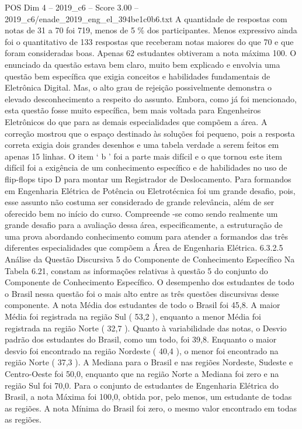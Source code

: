 \begin{textsample}{POS Dim 4 – 2019\_c6 – Score 3.00 – 2019\_c6/enade\_2019\_eng\_el\_394be1c0b6.txt}
A quantidade de respostas com notas de 31 a 70 foi 719, menos de 5 \% dos participantes.
Menos expressivo ainda foi o quantitativo de 133 respostas que receberam notas maiores do que 70 e que foram consideradas boas.
Apenas 62 estudantes obtiveram a nota máxima 100.
O enunciado da questão estava bem claro, muito bem explicado e envolvia uma questão bem específica que exigia conceitos e habilidades fundamentais de Eletrônica Digital.
Mas, o alto grau de rejeição possivelmente demonstra o elevado desconhecimento a respeito do assunto.
Embora, como já foi mencionado, esta questão fosse muito específica, bem mais voltada para Engenheiros Eletrônicos do que para as demais especialidades que compõem a área.
A correção mostrou que o espaço destinado às soluções foi pequeno, pois a resposta correta exigia dois grandes desenhos e uma tabela verdade a serem feitos em apenas 15 linhas.
O item ‘ b ’ foi a parte mais difícil e o que tornou este item difícil foi a exigência de um conhecimento específico e de habilidades no uso de flip-flops tipo D para montar um Registrador de Deslocamento.
Para formandos em Engenharia Elétrica de Potência ou Eletrotécnica foi um grande desafio, pois, esse assunto não costuma ser considerado de grande relevância, além de ser oferecido bem no início do curso.
Compreende -se como sendo realmente um grande desafio para a avaliação dessa área, especificamente, a estruturação de uma prova abordando conhecimento comum para atender a formandos das três diferentes especialidades que compõem a Área de Engenharia Elétrica. 6.3.2.5 Análise da Questão Discursiva 5 do Componente de Conhecimento Específico Na Tabela 6.21, constam as informações relativas à questão 5 do conjunto do Componente de Conhecimento Específico.
O desempenho dos estudantes de todo o Brasil nessa questão foi o mais alto entre as três questões discursivas desse componente.
A nota Média dos estudantes de todo o Brasil foi 45,8.
A maior Média foi registrada na região Sul ( 53,2 ), enquanto a menor Média foi registrada na região Norte ( 32,7 ).
Quanto à variabilidade das notas, o Desvio padrão dos estudantes do Brasil, como um todo, foi 39,8.
Enquanto o maior desvio foi encontrado na região Nordeste ( 40,4 ), o menor foi encontrado na região Norte ( 37,3 ).
A Mediana para o Brasil e nas regiões Nordeste, Sudeste e Centro-Oeste foi 50,0, enquanto que na região Norte a Mediana foi zero e na região Sul foi 70,0.
Para o conjunto de estudantes de Engenharia Elétrica do Brasil, a nota Máxima foi 100,0, obtida por, pelo menos, um estudante de todas as regiões.
A nota Mínima do Brasil foi zero, o mesmo valor encontrado em todas as regiões.

\end{textsample}
